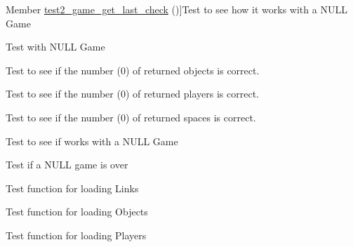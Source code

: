 \begin{DoxyRefList}
\hypertarget{test__test000083}{}%
Member \hyperlink{game__test_8h_af601b07387856d9fbf5fb30eaae11191}{test2\+\_\+game\+\_\+get\+\_\+last\+\_\+check} ()]Test to see how it works with a N\+U\+LL Game  
\item[\label{test__test000079}%
\hypertarget{test__test000079}{}%
Member \hyperlink{game__test_8h_ac6463a36d0a06d720225b64f894ec445}{test2\+\_\+game\+\_\+get\+\_\+last\+\_\+command} ()]Test with N\+U\+LL Game  
\item[\label{test__test000062}%
\hypertarget{test__test000062}{}%
Member \hyperlink{game__test_8h_a666e45de68b2bbc214dbd1c7f0cbc1ff}{test2\+\_\+game\+\_\+get\+\_\+objects\+\_\+number} ()]Test to see if the number (0) of returned objects is correct.  
\item[\label{test__test000058}%
\hypertarget{test__test000058}{}%
Member \hyperlink{game__test_8h_a2a530a4de5f42cebd34d3a2b13b571b3}{test2\+\_\+game\+\_\+get\+\_\+players\+\_\+number} ()]Test to see if the number (0) of returned players is correct.  
\item[\label{test__test000054}%
\hypertarget{test__test000054}{}%
Member \hyperlink{game__test_8h_ae8acea54aeabc7ca6bb3f4ccb7019947}{test2\+\_\+game\+\_\+get\+\_\+spaces\+\_\+number} ()]Test to see if the number (0) of returned spaces is correct.  
\item[\label{test__test000081}%
\hypertarget{test__test000081}{}%
Member \hyperlink{game__test_8h_a5828e75b146cd90e87938d17f5c0c114}{test2\+\_\+game\+\_\+get\+\_\+status\+\_\+last\+\_\+command} ()]Test to see if works with a N\+U\+LL Game  
\item[\label{test__test000037}%
\hypertarget{test__test000037}{}%
Member \hyperlink{game__test_8h_aad6c50be5f1d541ca5414b86558ef422}{test2\+\_\+game\+\_\+is\+\_\+over} ()]Test if a N\+U\+LL game is over  
\item[\label{test__test000024}%
\hypertarget{test__test000024}{}%
Member \hyperlink{game__reader__test_8h_a7366cf536491c6f3be1145b0d7b2b32c}{test2\+\_\+game\+\_\+reader\+\_\+load\+\_\+links} ()]Test function for loading Links  
\item[\label{test__test000020}%
\hypertarget{test__test000020}{}%
Member \hyperlink{game__reader__test_8h_a5bd7d88df7ebba1510197eafd63a4ca3}{test2\+\_\+game\+\_\+reader\+\_\+load\+\_\+objects} ()]Test function for loading Objects  
\item[\label{test__test000016}%
\hypertarget{test__test000016}{}%
Member \hyperlink{game__reader__test_8h_a2a92d2c5944de5ec790969ade0d10c8b}{test2\+\_\+game\+\_\+reader\+\_\+load\+\_\+players} ()]Test function for loading Players  

\end{DoxyRefList}
